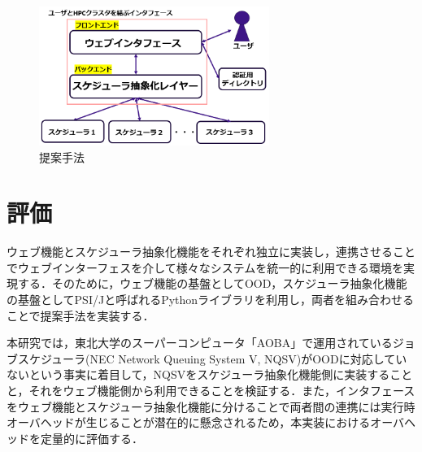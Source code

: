 \documentclass[a4paper,oneside,twocolumn,notitlepage,dvipdfmx]{jsarticle}
\begin{document}
\begin{figure}[h]
  \centering
  \includegraphics[width=75mm]{./fig/proposed_method.png}
  \caption{提案手法}
  \label{fig1}
\end{figure}

\vspace{3\baselineskip}
\section{評価}
ウェブ機能とスケジューラ抽象化機能をそれぞれ独立に実装し，連携させることでウェブインターフェスを介して様々なシステムを統一的に利用できる環境を実現する．そのために，ウェブ機能の基盤としてOOD，スケジューラ抽象化機能の基盤としてPSI/J\cite{citation_6}と呼ばれるPythonライブラリを利用し，両者を組み合わせることで提案手法を実装する．\par
本研究では，東北大学のスーパーコンピュータ「AOBA」で運用されているジョブスケジューラ(NEC Network Queuing System V, NQSV)がOODに対応していないという事実に着目して，NQSVをスケジューラ抽象化機能側に実装することと，それをウェブ機能側から利用できることを検証する．また，インタフェースをウェブ機能とスケジューラ抽象化機能に分けることで両者間の連携には実行時オーバヘッドが生じることが潜在的に懸念されるため，本実装におけるオーバヘッドを定量的に評価する．\par
\end{document}
